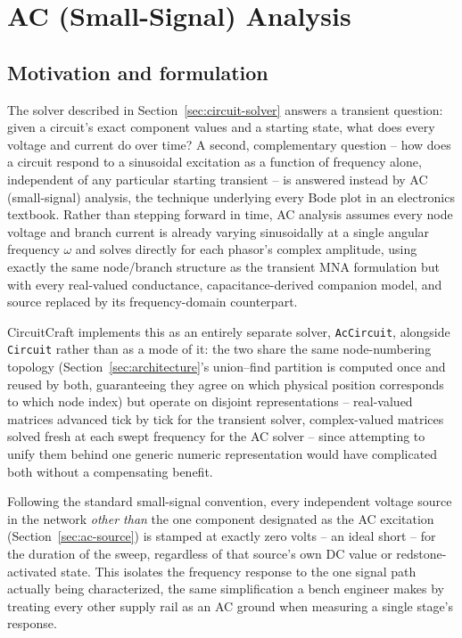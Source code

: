 \section{AC (Small-Signal) Analysis}
\label{sec:ac-analysis}

\subsection{Motivation and formulation}

The solver described in Section~\ref{sec:circuit-solver} answers a transient question: given a
circuit's exact component values and a starting state, what does every voltage and current do
over time? A second, complementary question -- how does a circuit respond to a sinusoidal
excitation as a function of frequency alone, independent of any particular starting transient --
is answered instead by AC (small-signal) analysis, the technique underlying every Bode plot in
an electronics textbook. Rather than stepping forward in time, AC analysis assumes every
node voltage and branch current is already varying sinusoidally at a single angular frequency
$\omega$ and solves directly for each phasor's complex amplitude, using exactly the same
node/branch structure as the transient MNA formulation but with every real-valued conductance,
capacitance-derived companion model, and source replaced by its frequency-domain counterpart.

CircuitCraft implements this as an entirely separate solver, \texttt{AcCircuit}, alongside
\texttt{Circuit} rather than as a mode of it: the two share the same node-numbering topology
(Section~\ref{sec:architecture}'s union--find partition is computed once and reused by both,
guaranteeing they agree on which physical position corresponds to which node index) but operate
on disjoint representations -- real-valued matrices advanced tick by tick for the transient
solver, complex-valued matrices solved fresh at each swept frequency for the AC solver -- since
attempting to unify them behind one generic numeric representation would have complicated both
without a compensating benefit.

Following the standard small-signal convention, every independent voltage source in the network
\emph{other than} the one component designated as the AC excitation (Section~\ref{sec:ac-source})
is stamped at exactly zero volts -- an ideal short -- for the duration of the sweep, regardless of
that source's own DC value or redstone-activated state. This isolates the frequency response to
the one signal path actually being characterized, the same simplification a bench engineer makes
by treating every other supply rail as an AC ground when measuring a single stage's response.

